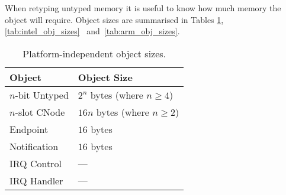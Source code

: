{When retyping untyped memory it is useful to know how much memory the
object will require. Object sizes are summarised in Tables
\ref{tab:obj_sizes}\ifxeightsix, \ref{tab:intel_obj_sizes}\else\ \fi{} 
and~\ref{tab:arm_obj_sizes}.

\begin{table}[tbp]
        \begin{center}
            \begin{tabular}{ll}
                \toprule
                  Object                & Object Size \\
                \midrule
                  $n$-bit Untyped       & $2^n$ bytes (where $n \ge 4$) \\
                  $n$-slot CNode        & $16n$ bytes (where $n \ge 2$) \\
                  Endpoint  		& $16$ bytes \\
                  Notification 		& $16$ bytes \\
                  IRQ Control           & --- \\
                  IRQ Handler           & --- \\
                \bottomrule
            \end{tabular}
        \end{center}
    \caption{Platform-independent object sizes.}
    \label{tab:obj_sizes}
\end{table}

}
